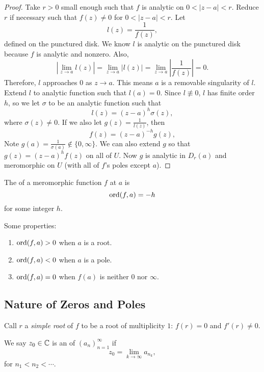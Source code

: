 \documentclass[notes]{subfile}
\begin{document}
\begin{proof}
    Take $r > 0$ small enough such that $f$ is analytic
    on $0 < |z-a| < r$.
    Reduce $r$ if necessary such that $f(z) \ne 0$ for
    $0 < |z-a| < r$.
    Let 
    \[ l(z) = \frac{1}{f(z)}, \]
    defined on the punctured disk.  
    We know $l$ is analytic on the punctured disk because
    $f$ is analytic and nonzero.
    Also,
    \[ \left| \lim_{z \to a} l(z) \right|
        = \lim_{z \to a} |l(z)|
        = \lim_{z \to a} \left| \frac{1}{f(z)}\right|
        = 0.
    \]
    Therefore, $l$ approaches $0$ as $z \to a$.
    This means $a$ is a removable singularity of $l$.
    Extend $l$ to analytic function such that $l(a) = 0$.
    Since $l \nequiv 0$, $l$ has finite order $h$, so we
    let $\sigma$ to be an analytic function such that
    \[ l(z) = (z-a)^h \sigma(z), \]
    where $\sigma(z) \ne 0$.
    If we also let $g(z) = \frac{1}{l(z)}$, then
    \[ f(z) = (z-a)^{-h} g(z), \]
    Note $g(a) = \frac{1}{\sigma(a)} \notin \{0, \infty \}$.
    We can also extend $g$ so that $g(z) = (z-a)^hf(z)$ 
    on all of $U$.
    Now $g$ is analytic in $D_r(a)$ and meromorphic on $U$
    (with all of $f$'s poles except $a$).
\end{proof}

\begin{definition}
    The  of a meromorphic function $f$ at 
    $a$ is 
    \[ \operatorname{ord}(f, a) = -h \]
    for some integer $h$.
\end{definition}

Some properties:
\begin{enumerate}
    \item $\operatorname{ord}(f, a) > 0$ when $a$ is a root.
    \item $\operatorname{ord}(f, a) < 0$ when $a$ is a pole.
    \item $\operatorname{ord}(f, a) = 0$ when $f(a)$ is neither $0$ nor
        $\infty$.
\end{enumerate}

\subsection{Nature of Zeros and Poles}

Call $r$ a \emph{simple root} of $f$ to be a root of 
multiplicity $1$: $f(r) = 0$ and $f'(r) \ne 0$.

\begin{definition}
    We say $z_0 \in \operatorname{\mathbb{C}}$ is an  of 
    $(a_n)_{n=1}^{\infty}$ if
    \[ z_0 = \lim_{k \to \infty} a_{n_k}, \]
    for $n_1 < n_2 < \cdots$.
\end{definition}
\end{document}
